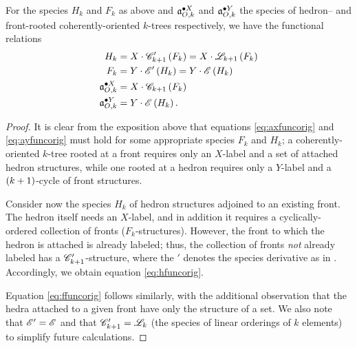 \documentclass[sectionflow,singlespace,twoside]{brandiss} %
\numberwithin{section}{chapter}
\numberwithin{figure}{chapter}
\begin{document}
\begin{theorem}\label{thm:funcdecompco}
  For the species $H_{k}$ and $F_{k}$ as above and $\pointed[X]{\mathfrak{a}}_{O, k}$ and $\pointed[Y]{\mathfrak{a}}_{O, k}$ the species of hedron-- and front-rooted coherently-oriented $k$-trees respectively, we have the functional relations
  \begin{align}
    H_{k} &= X \cdot \specname{C}'_{k+1} \pbrac{F_{k}} = X \cdot \specname{L}_{k+1} \pbrac{F_{k}} \label{eq:hfuncorig} \\
    F_{k} &= Y \cdot \specname{E}' \pbrac{H_{k}} = Y \cdot \specname{E} \pbrac{H_{k}} \label{eq:ffuncorig} \\
    \pointed[X]{\mathfrak{a}}_{O, k} &= X \cdot \specname{C}_{k+1} \pbrac{F_{k}} \label{eq:axfuncorig} \\
    \pointed[Y]{\mathfrak{a}}_{O, k} &= Y \cdot \specname{E} \pbrac{H_{k}} \label{eq:ayfuncorig}.
  \end{align}
\end{theorem}

\begin{proof}
  It is clear from the exposition above that equations \eqref{eq:axfuncorig} and \eqref{eq:ayfuncorig} must hold for some appropriate species $F_{k}$ and $H_{k}$; a coherently-oriented $k$-tree rooted at a front requires only an $X$-label and a set of attached hedron structures, while one rooted at a hedron requires only a $Y$-label and a $\pbrac{k+1}$-cycle of front structures.

  Consider now the species $H_{k}$ of hedron structures adjoined to an existing front.
  The hedron itself needs an $X$-label, and in addition it requires a cyclically-ordered collection of fronts ($F_{k}$-structures).
  However, the front to which the hedron is attached is already labeled; thus, the collection of fronts \emph{not} already labeled has a $\specname{C}'_{k+1}$-structure, where the $'$ denotes the species derivative as in \cite[\S 1.4]{bll:species}.
  Accordingly, we obtain equation \eqref{eq:hfuncorig}.

  Equation \eqref{eq:ffuncorig} follows similarly, with the additional observation that the hedra attached to a given front have only the structure of a set.
  We also note that $\specname{E}' = \specname{E}$ and that $\specname{C}'_{k+1} = \specname{L}_{k}$ (the species of linear orderings of $k$ elements) to simplify future calculations.
\end{proof}
\end{document}
